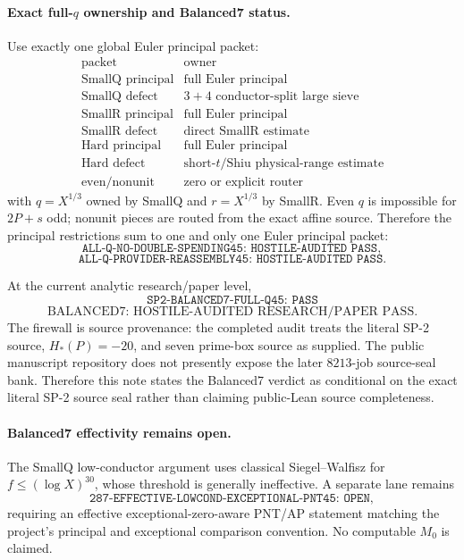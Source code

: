 \documentclass[11pt]{article}
\theoremstyle{definition}
\newcommand{\1}{\mathbf 1}
\begin{document}
\paragraph{Exact full-$q$ ownership and Balanced7 status.}
Use exactly one global Euler principal packet:
\[
\begin{array}{c|c}
\text{packet}&\text{owner}\\ \hline
\text{SmallQ principal}&\text{full Euler principal}\\
\text{SmallQ defect}&3+4\text{ conductor-split large sieve}\\
\text{SmallR principal}&\text{full Euler principal}\\
\text{SmallR defect}&\text{direct SmallR estimate}\\
\text{Hard principal}&\text{full Euler principal}\\
\text{Hard defect}&\text{short-}t\text{/Shiu physical-range estimate}\\
\text{even/nonunit}&\text{zero or explicit router}
\end{array}
\]
with $q=X^{1/3}$ owned by SmallQ and $r=X^{1/3}$ by SmallR.  Even $q$ is impossible for
$2P+s$ odd; nonunit pieces are routed from the exact affine source.  Therefore the
principal restrictions sum to one and only one Euler principal packet:
\[
\boxed{\texttt{ALL-Q-NO-DOUBLE-SPENDING45: HOSTILE-AUDITED PASS}},
\]
\[
\boxed{\texttt{ALL-Q-PROVIDER-REASSEMBLY45: HOSTILE-AUDITED PASS}}.
\]

At the current analytic research/paper level,
\[
\boxed{\texttt{SP2-BALANCED7-FULL-Q45: PASS}}
\]
\[
\boxed{\text{BALANCED7: HOSTILE-AUDITED RESEARCH/PAPER PASS}}.
\]
The firewall is source provenance: the completed audit treats the literal SP-2 source,
$H_*(P)=-20$, and seven prime-box source as supplied.  The public manuscript repository
does not presently expose the later $8213$-job source-seal bank.  Therefore this note states
the Balanced7 verdict as conditional on the exact literal SP-2 source seal rather than
claiming public-Lean source completeness.

\paragraph{Balanced7 effectivity remains open.}
The SmallQ low-conductor argument uses classical Siegel--Walfisz for
$f\le(\log X)^{30}$, whose threshold is generally ineffective.  A separate lane remains
\[
\boxed{\texttt{287-EFFECTIVE-LOWCOND-EXCEPTIONAL-PNT45: OPEN}},
\]
requiring an effective exceptional-zero-aware PNT/AP statement matching the project's
principal and exceptional comparison convention.  No computable $M_0$ is claimed.
\end{document}
